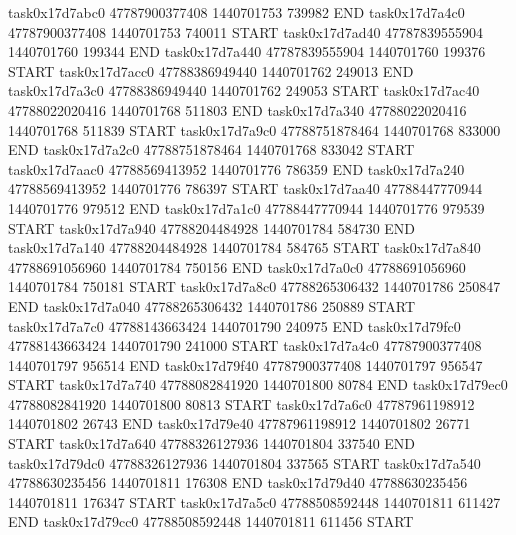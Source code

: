 task0x17d7abc0 47787900377408          1440701753               739982  END
task0x17d7a4c0 47787900377408          1440701753               740011  START
task0x17d7ad40 47787839555904          1440701760               199344  END
task0x17d7a440 47787839555904          1440701760               199376  START
task0x17d7acc0 47788386949440          1440701762               249013  END
task0x17d7a3c0 47788386949440          1440701762               249053  START
task0x17d7ac40 47788022020416          1440701768               511803  END
task0x17d7a340 47788022020416          1440701768               511839  START
task0x17d7a9c0 47788751878464          1440701768               833000  END
task0x17d7a2c0 47788751878464          1440701768               833042  START
task0x17d7aac0 47788569413952          1440701776               786359  END
task0x17d7a240 47788569413952          1440701776               786397  START
task0x17d7aa40 47788447770944          1440701776               979512  END
task0x17d7a1c0 47788447770944          1440701776               979539  START
task0x17d7a940 47788204484928          1440701784               584730  END
task0x17d7a140 47788204484928          1440701784               584765  START
task0x17d7a840 47788691056960          1440701784               750156  END
task0x17d7a0c0 47788691056960          1440701784               750181  START
task0x17d7a8c0 47788265306432          1440701786               250847  END
task0x17d7a040 47788265306432          1440701786               250889  START
task0x17d7a7c0 47788143663424          1440701790               240975  END
task0x17d79fc0 47788143663424          1440701790               241000  START
task0x17d7a4c0 47787900377408          1440701797               956514  END
task0x17d79f40 47787900377408          1440701797               956547  START
task0x17d7a740 47788082841920          1440701800                80784  END
task0x17d79ec0 47788082841920          1440701800                80813  START
task0x17d7a6c0 47787961198912          1440701802                26743  END
task0x17d79e40 47787961198912          1440701802                26771  START
task0x17d7a640 47788326127936          1440701804               337540  END
task0x17d79dc0 47788326127936          1440701804               337565  START
task0x17d7a540 47788630235456          1440701811               176308  END
task0x17d79d40 47788630235456          1440701811               176347  START
task0x17d7a5c0 47788508592448          1440701811               611427  END
task0x17d79cc0 47788508592448          1440701811               611456  START
